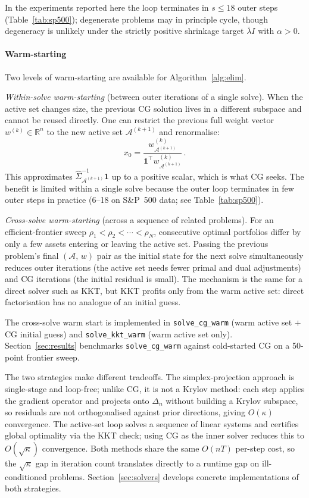 In the experiments reported here the loop terminates in $s \leq 18$ outer
steps (Table~\ref{tab:sp500}); degenerate problems may in principle cycle,
though degeneracy is unlikely under the strictly positive shrinkage
target $\bar\lambda I$ with $\alpha > 0$.

\paragraph{Warm-starting}
Two levels of warm-starting are available for Algorithm~\ref{alg:elim}.

\emph{Within-solve warm-starting} (between outer iterations of a single solve).
When the active set changes size, the previous CG solution lives in a different
subspace and cannot be reused directly. One can restrict the previous full
weight vector $w^{(k)} \in \mathbb{R}^n$ to the new active set
$\mathcal{A}^{(k+1)}$ and renormalise:
\[
  x_0 = \frac{w^{(k)}_{\mathcal{A}^{(k+1)}}}
             {\mathbf{1}^\top w^{(k)}_{\mathcal{A}^{(k+1)}}}\,.
\]
This approximates $\hat\Sigma_{\mathcal{A}^{(k+1)}}^{-1}\mathbf{1}$ up to a
positive scalar, which is what CG seeks.
The benefit is limited within a single solve because the outer loop terminates in few outer steps in practice (6--18 on S\&P~500 data; see Table~\ref{tab:sp500}).

\emph{Cross-solve warm-starting} (across a sequence of related problems).
For an efficient-frontier sweep $\rho_1 < \rho_2 < \cdots < \rho_N$, consecutive
optimal portfolios differ by only a few assets entering or leaving the active
set.
Passing the previous problem's final $(\mathcal{A},\,w)$ pair as the
initial state for the next solve simultaneously reduces outer iterations (the
active set needs fewer primal and dual adjustments) and CG iterations (the
initial residual is small).
The mechanism is the same for a direct solver
such as KKT, but KKT profits only from the warm active set: direct
factorisation has no analogue of an initial guess.

The cross-solve warm start is implemented in \texttt{solve\_cg\_warm}
(warm active set $+$ CG initial guess) and \texttt{solve\_kkt\_warm}
(warm active set only).  Section~\ref{sec:results} benchmarks \texttt{solve\_cg\_warm}
against cold-started CG on a 50-point frontier sweep.

\medskip
The two strategies make different tradeoffs. The simplex-projection approach is
single-stage and loop-free; unlike CG, it is not a Krylov method: each step applies
the gradient operator and projects onto $\Delta_n$ without building a Krylov subspace,
so residuals are not orthogonalised against prior directions, giving $O(\kappa)$
convergence. The active-set loop solves a sequence of linear systems and certifies
global optimality via the KKT check; using CG as the inner solver reduces this to
$O(\sqrt{\kappa})$ convergence. Both methods share the same $O(nT)$ per-step cost,
so the $\sqrt{\kappa}$ gap in iteration count translates directly to a runtime gap on
ill-conditioned problems.
Section~\ref{sec:solvers} develops concrete implementations of both strategies.
